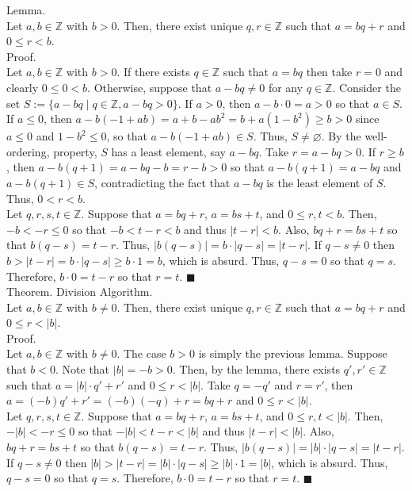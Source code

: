 \documentclass[twocolumn]{article}
\newcommand{\qed}{$\blacksquare$}
\let\emptyset\varnothing
\newcommand{\integers}{\mathbb{Z}}
\begin{document}
Lemma. \\
Let $a, b \in \integers$ with $b > 0$. Then, there exist unique $q, r \in \integers$ such that $a = bq + r$ and $0 \leq r < b$. \\
Proof. \\
Let $a, b \in \integers$ with $b > 0$. If there exists $q \in \integers$ such that $a = bq$ then take $r = 0$ and clearly $0 \leq 0 < b$. Otherwise, suppose that $a - bq \neq 0$ for any $q \in \integers$. Consider the set $S := \{ a - bq \mid q \in \integers, a - bq > 0 \}$. If $a > 0$, then $a - b \cdot 0 = a > 0$ so that $a \in S$. If $a \leq 0$, then $a - b(-1 + ab) = a + b - ab^2 = b + a(1 - b^2) \geq b > 0$ since $a \leq 0$ and $1 - b^2 \leq 0$, so that $a - b(-1 + ab) \in S$. Thus, $S \neq \emptyset$. By the well-ordering, property, $S$ has a least element, say $a - bq$. Take $r = a - bq > 0$. If $r \geq b$, then $a - b(q + 1) = a - bq - b = r - b > 0$ so that $a - b(q + 1) = a - bq$ and $a - b(q + 1) \in S$, contradicting the fact that $a - bq$ is the least element of $S$. Thus, $0 < r < b$. \\
Let $q, r, s, t \in \integers$. Suppose that $a = bq + r$, $a = bs + t$, and $0 \leq r, t < b$. Then, $-b < -r \leq 0$ so that $-b < t - r < b$ and thus $|t - r| < b$. Also, $bq + r = bs + t$ so that $b(q - s) = t - r$. Thus, $|b(q - s)| = b \cdot |q - s| = |t - r|$. If $q - s \neq 0$ then $b > |t - r| = b \cdot |q - s| \geq b \cdot 1 = b$, which is absurd. Thus, $q - s = 0$ so that $q = s$. Therefore, $b \cdot 0 = t - r$ so that $r = t$. \qed \\

Theorem. Division Algorithm. \\
Let $a, b \in \integers$ with $b \neq 0$. Then, there exist unique $q, r \in \integers$ such that $a = bq + r$ and $0 \leq r < |b|$. \\
Proof. \\
Let $a, b \in \integers$ with $b \neq 0$. The case $b > 0$ is simply the previous lemma. Suppose that $b < 0$. Note that $|b| = -b > 0$. Then, by the lemma, there exists $q', r' \in \integers$ such that $a = |b| \cdot q' + r'$ and $0 \leq r < |b|$. Take $q = -q'$ and $r = r'$, then $a = (-b)q' + r' = (-b)(-q) + r = bq + r$ and $0 \leq r < |b|$. \\
Let $q, r, s, t \in \integers$. Suppose that $a = bq + r$, $a = bs + t$, and $0 \leq r, t < |b|$. Then, $-|b| < -r \leq 0$ so that $-|b| < t - r < |b|$ and thus $|t - r| < |b|$. Also, $bq + r = bs + t$ so that $b(q - s) = t - r$. Thus, $|b(q - s)| = |b| \cdot |q - s| = |t - r|$. If $q - s \neq 0$ then $|b| > |t - r| = |b| \cdot |q - s| \geq |b| \cdot 1 = |b|$, which is absurd. Thus, $q - s = 0$ so that $q = s$. Therefore, $b \cdot 0 = t - r$ so that $r = t$. \qed \\
\end{document}
